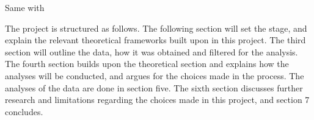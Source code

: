  

Same with \cite{amin2004index}
 
 
 
 
 
 
 The project is structured as follows. The following section will set the stage, and explain the relevant theoretical frameworks built upon in this project. The third section will outline the data, how it was obtained and filtered for the analysis. The fourth section builds upon the theoretical section and explains how the analyses will be conducted, and argues for the choices made in the process. The analyses of the data are done in section five. The sixth section discusses further research and limitations regarding the choices made in this project, and section 7 concludes.